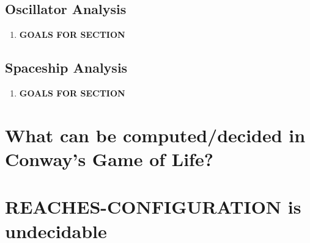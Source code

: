 \documentclass{article}
\theoremstyle{definition}
\theoremstyle{plain}
\theoremstyle{plain}
\begin{document}
\subsection{Oscillator Analysis}
\begin{enumerate}
  \item[] \textbf{GOALS FOR SECTION}
\end{enumerate}

\subsection{Spaceship Analysis}
\begin{enumerate}
  \item[] \textbf{GOALS FOR SECTION}
\end{enumerate}

\section{What can be computed/decided in Conway’s Game of Life?}

\section{REACHES-CONFIGURATION is undecidable}

\printbibliography
\end{document}

